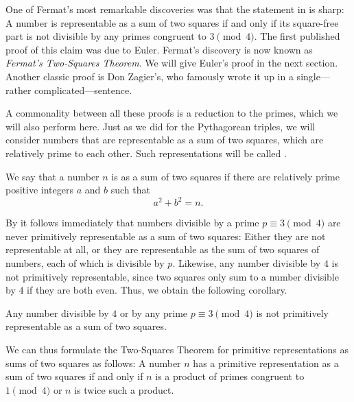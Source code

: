 One of Fermat's most remarkable discoveries was that the statement in  is sharp: A number is representable as a sum of two squares if and only if its square-free part is not divisible by any primes congruent to $3\pmod{4}$. The first published proof of this claim was due to Euler. Fermat's discovery is now known as \emph{Fermat's Two-Squares Theorem}. We will give Euler's proof in the next section. Another classic proof is Don Zagier's, who famously wrote it up in a single---rather complicated---sentence.

A commonality between all these proofs is a reduction to the primes, which we will also perform here. Just as we did for the Pythagorean triples, we will consider numbers that are representable as a sum of two squares, which are relatively prime to each other. Such representations will be called .

\begin{definition}
  We say that a number $n$ is  as a sum of two squares if there are relatively prime positive integers $a$ and $b$ such that
  \begin{equation*}
    a^2+b^2=n.
  \end{equation*}
\end{definition}

By  it follows immediately that numbers divisible by a prime $p\equiv 3\pmod{4}$ are never primitively representable as a sum of two squares: Either they are not representable at all, or they are representable as the sum of two squares of numbers, each of which is divisible by $p$. Likewise, any number divisible by $4$ is not primitively representable, since two squares only sum to a number divisible by $4$ if they are both even. Thus, we obtain the following corollary.

\begin{corollary}\label{corollary:obstruction-primitive-sum-of-two-squares}
  Any number divisible by $4$ or by any prime $p\equiv 3\pmod{4}$ is not primitively representable as a sum of two squares.
\end{corollary}

We can thus formulate the Two-Squares Theorem for primitive representations as sums of two squares as follows: A number $n$ has a primitive representation as a sum of two squares if and only if $n$ is a product of primes congruent to $1\pmod{4}$ or $n$ is twice such a product.

